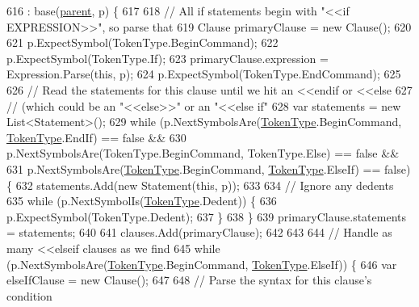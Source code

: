 \begin{DoxyCode}
616                                                              : base(\hyperlink{a00120_af313a82103fcc2ff5a177dbb06b92f7b}{parent}, p) \{
617 
618                 \textcolor{comment}{// All if statements begin with "<<if EXPRESSION>>", so parse that}
619                 Clause primaryClause = \textcolor{keyword}{new} Clause();
620 
621                 p.ExpectSymbol(TokenType.BeginCommand);
622                 p.ExpectSymbol(TokenType.If);
623                 primaryClause.expression = Expression.Parse(\textcolor{keyword}{this}, p);
624                 p.ExpectSymbol(TokenType.EndCommand);
625 
626                 \textcolor{comment}{// Read the statements for this clause until  we hit an <<endif or <<else}
627                 \textcolor{comment}{// (which could be an "<<else>>" or an "<<else if"}
628                 var statements = \textcolor{keyword}{new} List<Statement>();
629                 \textcolor{keywordflow}{while} (p.NextSymbolsAre(\hyperlink{a00029_a301aa7c866593a5b625a8fc158bbeace}{TokenType}.BeginCommand, 
      \hyperlink{a00029_a301aa7c866593a5b625a8fc158bbeace}{TokenType}.EndIf) == \textcolor{keyword}{false} &&
630                     p.NextSymbolsAre(TokenType.BeginCommand, TokenType.Else) == \textcolor{keyword}{false} &&
631                     p.NextSymbolsAre(\hyperlink{a00029_a301aa7c866593a5b625a8fc158bbeace}{TokenType}.BeginCommand, \hyperlink{a00029_a301aa7c866593a5b625a8fc158bbeace}{TokenType}.ElseIf) == \textcolor{keyword}{false}) 
      \{
632                     statements.Add(\textcolor{keyword}{new} Statement(\textcolor{keyword}{this}, p));
633 
634                     \textcolor{comment}{// Ignore any dedents}
635                     \textcolor{keywordflow}{while} (p.NextSymbolIs(\hyperlink{a00029_a301aa7c866593a5b625a8fc158bbeace}{TokenType}.Dedent)) \{
636                         p.ExpectSymbol(TokenType.Dedent);
637                     \}
638                 \}
639                 primaryClause.statements = statements;
640 
641                 clauses.Add(primaryClause);
642 
643 
644                 \textcolor{comment}{// Handle as many <<elseif clauses as we find}
645                 \textcolor{keywordflow}{while} (p.NextSymbolsAre(\hyperlink{a00029_a301aa7c866593a5b625a8fc158bbeace}{TokenType}.BeginCommand, 
      \hyperlink{a00029_a301aa7c866593a5b625a8fc158bbeace}{TokenType}.ElseIf)) \{
646                     var elseIfClause = \textcolor{keyword}{new} Clause();
647 
648                     \textcolor{comment}{// Parse the syntax for this clause's condition}

\end{DoxyCode}
